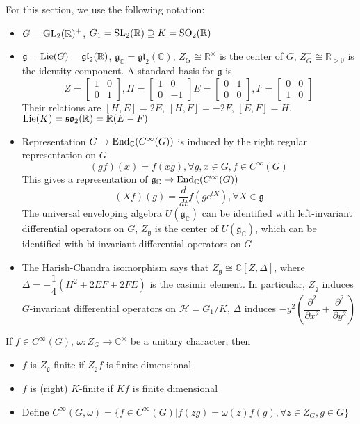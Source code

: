 \documentclass[main]{subfiles}
\begin{document}
\begin{definition}
For this section, we use the following notation:
\begin{itemize}
\item $G=\operatorname{GL}_2(\mathbb R)^+$, $G_1=\operatorname{SL}_2(\mathbb R)\supseteq K=\operatorname{SO}_2(\mathbb R)$
\item $\mathfrak g=\operatorname{Lie}(G)=\mathfrak{gl}_2(\mathbb R)$, $\mathfrak g_{\mathbb C}=\mathfrak{gl}_2(\mathbb C)$, $Z_G\cong\mathbb R^\times$ is the center of $G$, $Z^+_G\cong\mathbb R_{>0}$ is the identity component. A standard basis for $\mathfrak g$ is
\[Z=\begin{bmatrix}
1&0\\
0&1
\end{bmatrix},H=\begin{bmatrix}
1&0\\
0&-1
\end{bmatrix}E=\begin{bmatrix}
0&1\\
0&0
\end{bmatrix},F=\begin{bmatrix}
0&0\\
1&0
\end{bmatrix}\]
Their relations are $[H,E]=2E$, $[H,F]=-2F$, $[E,F]=H$. $\operatorname{Lie}(K)=\mathfrak{so}_2(\mathbb R)=\mathbb R(E-F)$
\item Representation $G\to\operatorname{End}_{\mathbb C}(C^\infty(G))$ is induced by the right regular representation on $G$
\[(gf)(x)=f(xg),\forall g,x\in G,f\in C^\infty(G)\]
This gives a representation of $\mathfrak g_{\mathbb C}\to\operatorname{End}_{\mathbb C}(C^\infty(G))$
\[(Xf)(g)=\frac{d}{dt}f(ge^{tX}),\forall X\in\mathfrak g\]
The universal enveloping algebra $U(\mathfrak g_{\mathbb C})$ can be identified with left-invariant differential operators on $G$, $Z_{\mathfrak g}$ is the center of $U(\mathfrak g_{\mathbb C})$, which can be identified with bi-invariant differential operators on $G$
\item The Harish-Chandra isomorphism says that $Z_{\mathfrak g}\cong\mathbb C[Z,\Delta]$, where $\Delta=-\dfrac{1}{4}(H^2+2EF+2FE)$ is the casimir element. In particular, $Z_{\mathfrak g}$ induces $G$-invariant differential operators on $\mathcal H=G_1/K$, $\Delta$ induces $-y^2\left(\dfrac{\partial^2}{\partial x^2}+\dfrac{\partial^2}{\partial y^2}\right)$
\end{itemize}
\end{definition}

\begin{definition}
If $f\in C^\infty(G)$, $\omega:Z_G\to\mathbb C^\times$ be a unitary character, then
\begin{itemize}
\item $f$ is $Z_{\mathfrak g}$-finite if $Z_{\mathfrak g}f$ is finite dimensional
\item $f$ is (right) $K$-finite if $Kf$ is finite dimensional 
\item Define $C^\infty(G,\omega)=\{f\in C^\infty(G)|f(zg)=\omega(z)f(g),\forall z\in Z_G,g\in G\}$
\end{itemize}
\end{definition}
\end{document}
